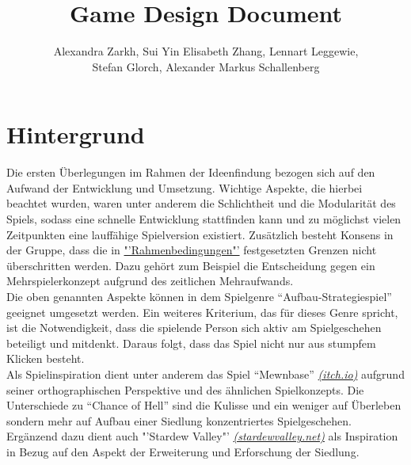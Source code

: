 \documentclass[paper=A4,pagesize=auto,12pt,headinclude=true,footinclude=true,BCOR=0mm,DIV=calc]{scrartcl}
\title{Game Design Document}
\author{Alexandra Zarkh, Sui Yin Elisabeth Zhang, Lennart Leggewie,\\ Stefan Glorch, Alexander Markus Schallenberg}
\begin{document}
	
\begin{titlepage}
	\maketitle
\end{titlepage}


\tableofcontents
\newpage

\section{Hintergrund}\label{sec:Hintergrund}




Die ersten Überlegungen im Rahmen der Ideenfindung bezogen sich auf den Aufwand der Entwicklung und Umsetzung. Wichtige Aspekte, die hierbei beachtet wurden, waren unter anderem die Schlichtheit und die Modularität des Spiels, sodass eine schnelle Entwicklung stattfinden kann und zu möglichst vielen Zeitpunkten eine lauffähige Spielversion existiert. Zusätzlich besteht Konsens in der Gruppe, dass die in \hyperref[sec:Rahmenbedingungen]{"'Rahmenbedingungen"'} festgesetzten Grenzen nicht überschritten werden. Dazu gehört zum Beispiel die Entscheidung gegen ein Mehrspielerkonzept aufgrund des zeitlichen Mehraufwands.\\
Die oben genannten Aspekte können in dem Spielgenre "`Aufbau-Strategiespiel"' geeignet umgesetzt werden. Ein weiteres Kriterium, das für dieses Genre spricht, ist die Notwendigkeit, dass die spielende Person sich aktiv am Spielgeschehen beteiligt und mitdenkt. Daraus folgt, dass das Spiel nicht nur aus stumpfem Klicken besteht.\\
Als Spielinspiration dient unter anderem das Spiel "`Mewnbase"' \hyperref{https://cairn4.itch.io/mewnbase}{}{}{\textit{(itch.io)}}  aufgrund seiner orthographischen Perspektive und des ähnlichen Spielkonzepts. Die Unterschiede zu "`Chance of Hell"' sind die Kulisse und ein weniger auf Überleben sondern mehr auf Aufbau einer Siedlung konzentriertes Spielgeschehen.\\
Ergänzend dazu dient auch "'Stardew Valley"' \hyperref{https://www.stardewvalley.net/}{}{}{\textit{(stardewvalley.net)}} als Inspiration in Bezug auf den Aspekt der Erweiterung und Erforschung der Siedlung.
\end{document}
